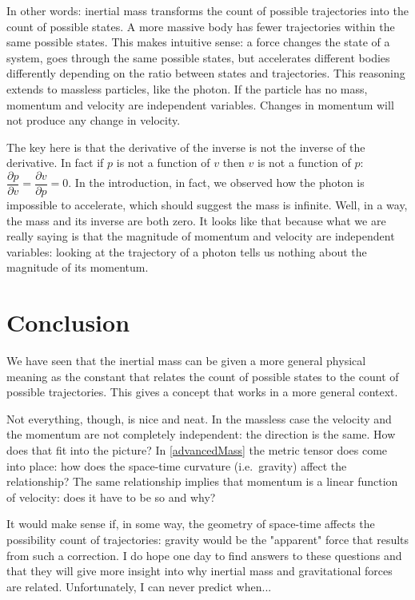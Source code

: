 \documentclass[aps,pra,10pt,floatfix,nofootinbib]{revtex4-1}
\theoremstyle{definition}
\begin{document}
In other words: inertial mass transforms the count of possible trajectories into the count of possible states. A more massive body has fewer trajectories within the same possible states. This makes intuitive sense: a force changes the state of a system, goes through the same possible states, but accelerates different bodies differently depending on the ratio between states and trajectories. This reasoning extends to massless particles, like the photon. If the particle has no mass, momentum and velocity are independent variables. Changes in momentum will not produce any change in velocity.

The key here is that the derivative of the inverse is not the inverse of the derivative. In fact if $p$ is not a function of $v$ then $v$ is not a function of $p$: $\dfrac{\partial p}{\partial v} = \dfrac{\partial v}{\partial p} = 0$. In the introduction, in fact, we observed how the photon is impossible to accelerate, which should suggest the mass is infinite. Well, in a way, the mass and its inverse are both zero. It looks like that because what we are really saying is that the magnitude of momentum and velocity are independent variables: looking at the trajectory of a photon tells us nothing about the magnitude of its momentum.

\section{Conclusion}

We have seen that the inertial mass can be given a more general physical meaning as the constant that relates the count of possible states to the count of possible trajectories. This gives a concept that works in a more general context.

Not everything, though, is nice and neat. In the massless case the velocity and the momentum are not completely independent: the direction is the same. How does that fit into the picture? In \eqref{advancedMass} the metric tensor does come into place: how does the space-time curvature (i.e.~gravity) affect the relationship? The same relationship implies that momentum is a linear function of velocity: does it have to be so and why?

It would make sense if, in some way, the geometry of space-time affects the possibility count of trajectories: gravity would be the "apparent" force that results from such a correction. I do hope one day to find answers to these questions and that they will give more insight into why inertial mass and gravitational forces are related. Unfortunately, I can never predict when...
\end{document}
